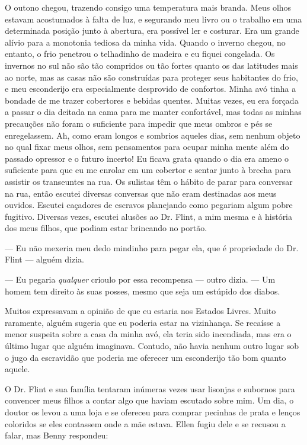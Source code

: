 O outono chegou, trazendo consigo uma
temperatura mais branda. Meus olhos estavam acostumados à falta de luz,
e segurando meu livro ou o trabalho em uma determinada posição junto à
abertura, era possível ler e costurar. Era um grande alívio para a
monotonia tediosa da minha vida. Quando o inverno chegou, no entanto, o
frio penetrou o telhadinho de madeira e eu fiquei congelada. Os invernos
no sul não são tão compridos ou tão fortes quanto os das latitudes mais
ao norte, mas as casas não são construídas para proteger seus habitantes
do frio, e meu esconderijo era especialmente desprovido de confortos.
Minha avó tinha a bondade de me trazer cobertores e bebidas quentes.
Muitas vezes, eu era forçada a passar o dia deitada na cama para me
manter confortável, mas todas as minhas precauções não foram o
suficiente para impedir que meus ombros e pés se enregelassem. Ah, como
eram longos e sombrios aqueles dias, sem nenhum objeto no qual fixar
meus olhos, sem pensamentos para ocupar minha mente além do passado
opressor e o futuro incerto! Eu ficava grata quando o dia era ameno o
suficiente para que eu me enrolar em um cobertor e sentar junto à brecha
para assistir os transeuntes na rua. Os sulistas têm o hábito de parar
para conversar na rua, então escutei diversas conversas que não eram
destinadas aos meus ouvidos. Escutei caçadores de escravos planejando
como pegariam algum pobre fugitivo. Diversas vezes, escutei alusões ao
Dr. Flint, a mim mesma e à história dos meus filhos, que podiam estar
brincando no portão.

--- Eu não mexeria meu dedo mindinho para pegar ela, que é propriedade
do Dr. Flint --- alguém dizia.

--- Eu pegaria \emph{qualquer} crioulo por essa recompensa --- outro
dizia. --- Um homem tem direito às suas posses, mesmo que seja um
estúpido dos diabos.

Muitos expressavam a opinião de que eu estaria nos Estados Livres. Muito
raramente, alguém sugeria que eu poderia estar na vizinhança. Se
recaísse a menor suspeita sobre a casa da minha avó, ela teria sido
incendiada, mas era o último lugar que alguém imaginava. Contudo, não
havia nenhum outro lugar sob o jugo da escravidão que poderia me
oferecer um esconderijo tão bom quanto aquele.

O Dr. Flint e sua família tentaram
inúmeras vezes usar lisonjas e subornos para convencer meus filhos a
contar algo que haviam escutado sobre mim. Um dia, o doutor os levou a
uma loja e se ofereceu para comprar pecinhas de prata e lenços coloridos
se eles contassem onde a mãe estava. Ellen fugiu dele e se recusou a
falar, mas Benny respondeu:

